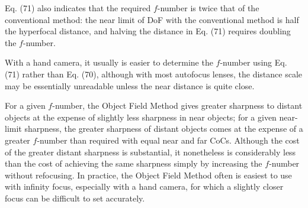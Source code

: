 \documentclass[11pt, oneside]{scrartcl}   	%
\begin{document}

Eq. (71) also indicates that the required $f$-number is twice that of the conventional method: the near limit of DoF with the conventional method is half the hyperfocal distance, and halving the distance in Eq. (71) requires doubling the $f$-number.

With a hand camera, it usually is easier to determine the $f$-number using Eq. (71) rather than Eq. (70), although with most autofocus lenses, the distance scale may be essentially unreadable unless the near distance is quite close.

For a given $f$-number, the Object Field Method gives greater sharpness to distant objects at the expense of slightly less sharpness in near objects; for a given near-limit sharpness, the greater sharpness of distant objects comes at the expense of a greater $f$-number than required with equal near and far CoCs. Although the cost of the greater distant sharpness is substantial, it nonetheless is considerably less than the cost of achieving the same sharpness simply by increasing the $f$-number without refocusing. In practice, the Object Field Method often is easiest to use with infinity focus, especially with a hand camera, for which a slightly closer focus can be difficult to set accurately.
\end{document}
